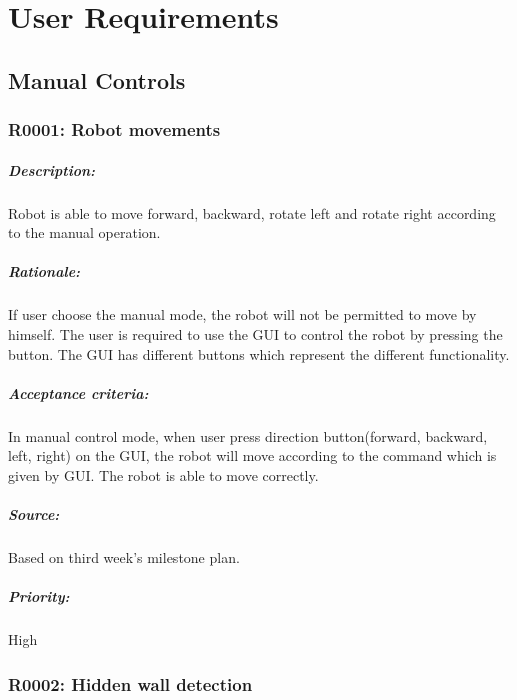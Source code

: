 \documentclass[11pt, a4paper]{report}
\begin{document}
\pagebreak




\chapter{User Requirements}
\section{Manual Controls}
\subsection{R0001: Robot movements}
\paragraph{Description: }
Robot is able to move forward, backward, rotate left and rotate right according to the manual operation. 
\paragraph{Rationale: }
If user choose the manual mode, the robot will not be permitted  to move by himself. The user is required to use the GUI to control the robot by pressing the button. The GUI has different buttons which represent the different functionality.
\paragraph{Acceptance criteria: }
In manual control mode, when user press direction button(forward, backward, left, right) on the GUI, the robot will move according to the command which is given by GUI. The robot is able to move correctly.   
\paragraph{Source: }
Based on third week's milestone plan. 
\paragraph{Priority: }
High



\subsection{R0002: Hidden wall detection}
\end{document}
